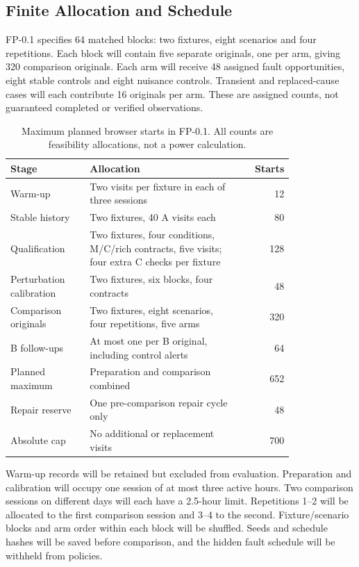 \subsection{Finite Allocation and Schedule}

FP-0.1 specifies 64 matched blocks: two fixtures, eight scenarios and four repetitions. Each block will contain five separate originals, one per arm, giving 320 comparison originals. Each arm will receive 48 assigned fault opportunities, eight stable controls and eight nuisance controls. Transient and replaced-cause cases will each contribute 16 originals per arm. These are assigned counts, not guaranteed completed or verified observations.

\begin{table}[htbp]
\centering
\caption{Maximum planned browser starts in FP-0.1. All counts are feasibility allocations, not a power calculation.}
\label{tab:pilot-allocation}
\begin{tabular}{p{0.29\linewidth}p{0.52\linewidth}r}
\toprule
Stage & Allocation & Starts \\
\midrule
Warm-up & Two visits per fixture in each of three sessions & 12 \\
Stable history & Two fixtures, 40 A visits each & 80 \\
Qualification & Two fixtures, four conditions, M/C/rich contracts, five visits; four extra C checks per fixture & 128 \\
Perturbation calibration & Two fixtures, six blocks, four contracts & 48 \\
Comparison originals & Two fixtures, eight scenarios, four repetitions, five arms & 320 \\
B follow-ups & At most one per B original, including control alerts & 64 \\
\midrule
Planned maximum & Preparation and comparison combined & 652 \\
Repair reserve & One pre-comparison repair cycle only & 48 \\
Absolute cap & No additional or replacement visits & 700 \\
\bottomrule
\end{tabular}
\end{table}

Warm-up records will be retained but excluded from evaluation. Preparation and calibration will occupy one session of at most three active hours. Two comparison sessions on different days will each have a 2.5-hour limit. Repetitions 1--2 will be allocated to the first comparison session and 3--4 to the second. Fixture/scenario blocks and arm order within each block will be shuffled. Seeds and schedule hashes will be saved before comparison, and the hidden fault schedule will be withheld from policies.

